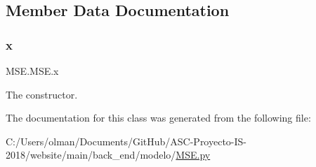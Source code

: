 \subsection{Member Data Documentation}
\mbox{\label{class_m_s_e_1_1_m_s_e_a3c8a7df08d33bbbdcce9204075542b25}} 
\subsubsection{\texorpdfstring{x}{x}}
{\footnotesize\ttfamily M\+S\+E.\+M\+S\+E.\+x}



The constructor. 



The documentation for this class was generated from the following file\+:\begin{DoxyCompactItemize}
\item 
C\+:/\+Users/olman/\+Documents/\+Git\+Hub/\+A\+S\+C-\/\+Proyecto-\/\+I\+S-\/2018/website/main/back\+\_\+end/modelo/\mbox{\hyperlink{_m_s_e_8py}{M\+S\+E.\+py}}\end{DoxyCompactItemize}
